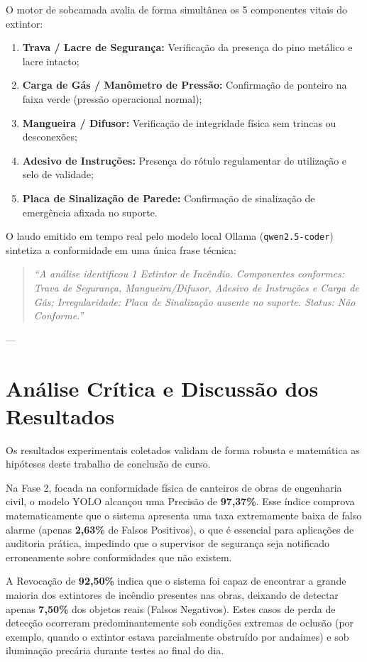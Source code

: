 O motor de sobcamada avalia de forma simultânea os 5 componentes vitais do extintor:
\begin{enumerate}
    \item \textbf{Trava / Lacre de Segurança:} Verificação da presença do pino metálico e lacre intacto;
    \item \textbf{Carga de Gás / Manômetro de Pressão:} Confirmação de ponteiro na faixa verde (pressão operacional normal);
    \item \textbf{Mangueira / Difusor:} Verificação de integridade física sem trincas ou desconexões;
    \item \textbf{Adesivo de Instruções:} Presença do rótulo regulamentar de utilização e selo de validade;
    \item \textbf{Placa de Sinalização de Parede:} Confirmação de sinalização de emergência afixada no suporte.
\end{enumerate}

O laudo emitido em tempo real pelo modelo local Ollama (\texttt{qwen2.5-coder}) sintetiza a conformidade em uma única frase técnica:
\begin{quote}
    \textit{``A análise identificou 1 Extintor de Incêndio. Componentes conformes: Trava de Segurança, Mangueira/Difusor, Adesivo de Instruções e Carga de Gás; Irregularidade: Placa de Sinalização ausente no suporte. Status: Não Conforme.''}
\end{quote}

---

\section{Análise Crítica e Discussão dos Resultados}
Os resultados experimentais coletados validam de forma robusta e matemática as hipóteses deste trabalho de conclusão de curso. 

Na Fase 2, focada na conformidade física de canteiros de obras de engenharia civil, o modelo YOLO alcançou uma Precisão de \textbf{97,37\%}. Esse índice comprova matematicamente que o sistema apresenta uma taxa extremamente baixa de falso alarme (apenas \textbf{2,63\%} de Falsos Positivos), o que é essencial para aplicações de auditoria prática, impedindo que o supervisor de segurança seja notificado erroneamente sobre conformidades que não existem.

A Revocação de \textbf{92,50\%} indica que o sistema foi capaz de encontrar a grande maioria dos extintores de incêndio presentes nas obras, deixando de detectar apenas \textbf{7,50\%} dos objetos reais (Falsos Negativos). Estes casos de perda de detecção ocorreram predominantemente sob condições extremas de oclusão (por exemplo, quando o extintor estava parcialmente obstruído por andaimes) e sob iluminação precária durante testes ao final do dia.

